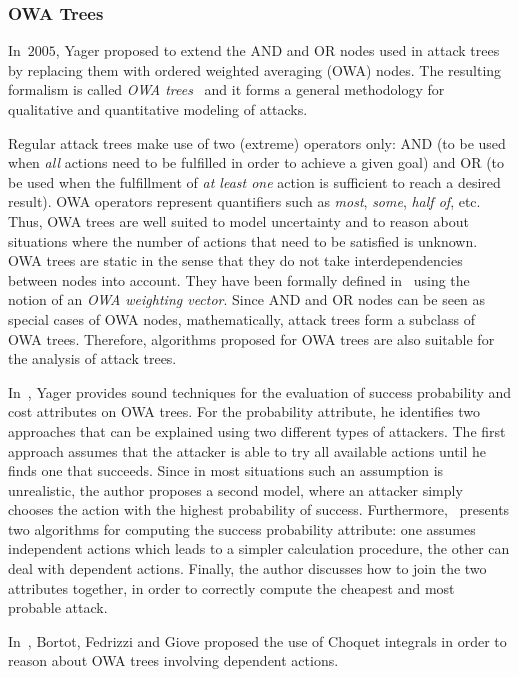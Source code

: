 \documentclass[a4paper]{article}
\begin{document}
\subsubsection{OWA Trees} 
\label{sec:OWA_trees}

In~$2005$, Yager proposed to extend the AND and OR nodes used in attack trees by
replacing them with ordered weighted averaging (OWA) nodes. The resulting
formalism is called \emph{OWA trees}~\cite{Yage} and it forms a general
methodology for qualitative and quantitative modeling of attacks.

Regular attack trees make use of two (extreme) operators only: AND (to be used
when \emph{all} actions need to be fulfilled in order to achieve a given goal)
and OR (to be used when the fulfillment of \emph{at least one} action is
sufficient to reach a desired result). OWA operators represent quantifiers such
as \emph{most}, \emph{some}, \emph{half of}, etc. Thus, OWA trees are well
suited to model uncertainty and to reason about situations where the number of
actions that need to be satisfied is unknown. OWA trees are static in the sense
that they do not take interdependencies between nodes into account. They have
been formally defined in~\cite{Yage} using the notion of an \emph{OWA weighting
vector}. Since AND and OR nodes can be seen as special cases of OWA nodes,
mathematically, attack trees form a subclass of OWA trees. Therefore, algorithms
proposed for OWA trees are also suitable for the analysis of attack trees.

In~\cite{Yage}, Yager provides sound techniques for the evaluation of success
probability and cost attributes on OWA trees. For the probability attribute, he
identifies two approaches that can be explained using two different types of
attackers. The first approach assumes that the attacker is able to try all
available actions until he finds one that succeeds. Since in most situations
such an assumption is unrealistic, the author proposes a second model, where an
attacker simply chooses the action with the highest probability of success.
Furthermore,~\cite{Yage} presents two algorithms for computing the success
probability attribute: one assumes independent actions which leads to a simpler
calculation procedure, the other can deal with dependent actions. Finally, the
author discusses how to join the two attributes together, in order to correctly
compute the cheapest and most probable attack.

In~\cite{BoFeGi}, Bortot, Fedrizzi and Giove proposed the use of Choquet
integrals in order to reason about OWA trees involving dependent actions.
\end{document}
